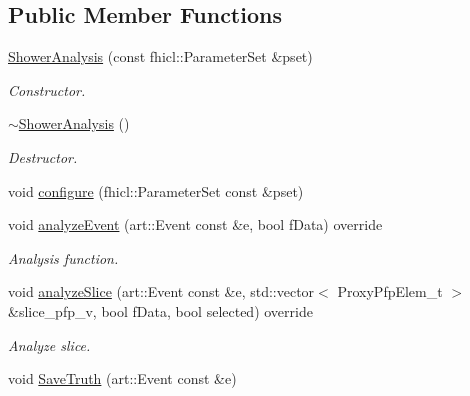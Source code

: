 \subsection*{Public Member Functions}
\begin{DoxyCompactItemize}
\item 
\hyperlink{classanalysis_1_1ShowerAnalysis_a6ea40aa403312ba7acc5434c1c66df63}{Shower\+Analysis} (const fhicl\+::\+Parameter\+Set \&pset)
\begin{DoxyCompactList}\small\item\em Constructor. \end{DoxyCompactList}\item 
\hyperlink{classanalysis_1_1ShowerAnalysis_af16c1759f0122ba30f7839c4003c0df7}{$\sim$\+Shower\+Analysis} ()\hypertarget{classanalysis_1_1ShowerAnalysis_af16c1759f0122ba30f7839c4003c0df7}{}\label{classanalysis_1_1ShowerAnalysis_af16c1759f0122ba30f7839c4003c0df7}

\begin{DoxyCompactList}\small\item\em Destructor. \end{DoxyCompactList}\item 
void \hyperlink{classanalysis_1_1ShowerAnalysis_a973cb90e6fa423b88ca3a9667d467b1e}{configure} (fhicl\+::\+Parameter\+Set const \&pset)
\item 
void \hyperlink{classanalysis_1_1ShowerAnalysis_a5ae15109590ea737320bf13cefa5cc3f}{analyze\+Event} (art\+::\+Event const \&e, bool f\+Data) override
\begin{DoxyCompactList}\small\item\em Analysis function. \end{DoxyCompactList}\item 
void \hyperlink{classanalysis_1_1ShowerAnalysis_a957be06c08e5777cd684c84ca53bc45e}{analyze\+Slice} (art\+::\+Event const \&e, std\+::vector$<$ Proxy\+Pfp\+Elem\+\_\+t $>$ \&slice\+\_\+pfp\+\_\+v, bool f\+Data, bool selected) override\hypertarget{classanalysis_1_1ShowerAnalysis_a957be06c08e5777cd684c84ca53bc45e}{}\label{classanalysis_1_1ShowerAnalysis_a957be06c08e5777cd684c84ca53bc45e}

\begin{DoxyCompactList}\small\item\em Analyze slice. \end{DoxyCompactList}\item 
void \hyperlink{classanalysis_1_1ShowerAnalysis_a0753806916baaf34f1ab0efa0dc4f4cc}{Save\+Truth} (art\+::\+Event const \&e)\hypertarget{classanalysis_1_1ShowerAnalysis_a0753806916baaf34f1ab0efa0dc4f4cc}{}\label{classanalysis_1_1ShowerAnalysis_a0753806916baaf34f1ab0efa0dc4f4cc}


\end{DoxyCompactItemize}

